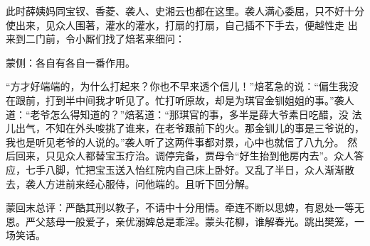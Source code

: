 \begin{parag}
    此时薛姨妈同宝钗、香菱、袭人、史湘云也都在这里。袭人满心委屈，只不好十分使出来，见众人围著，灌水的灌水，打扇的打扇，自己插不下手去，便越性走 出来到二门前，令小厮们找了焙茗来细问：\begin{note}蒙侧：各自有各自一番作用。\end{note}“方才好端端的，为什么打起来？你也不早来透个信儿！”焙茗急的说：“偏生我没在跟前，打到半中间我才听见了。忙打听原故，却是为琪官金钏姐姐的事。”袭人道：“老爷怎么得知道的？”焙茗道：“那琪官的事，多半是薛大爷素日吃醋，没 法儿出气，不知在外头唆挑了谁来，在老爷跟前下的火。那金钏儿的事是三爷说的，我也是听见老爷的人说的。”袭人听了这两件事都对景，心中也就信了八九分。 然后回来，只见众人都替宝玉疗治。调停完备，贾母令“好生抬到他房内去”。众人答应，七手八脚，忙把宝玉送入怡红院内自己床上卧好。又乱了半日，众人渐渐散去，袭人方进前来经心服侍，问他端的。且听下回分解。
\end{parag}


\begin{parag}
    \begin{note}蒙回末总评：严酷其刑以教子，不请中十分用情。牵连不断以思婢，有恩处一等无恩。严父慈母一般爱子，亲优溺婢总是乖淫。蒙头花柳，谁解春光。跳出樊笼，一场笑话。\end{note}
\end{parag}

